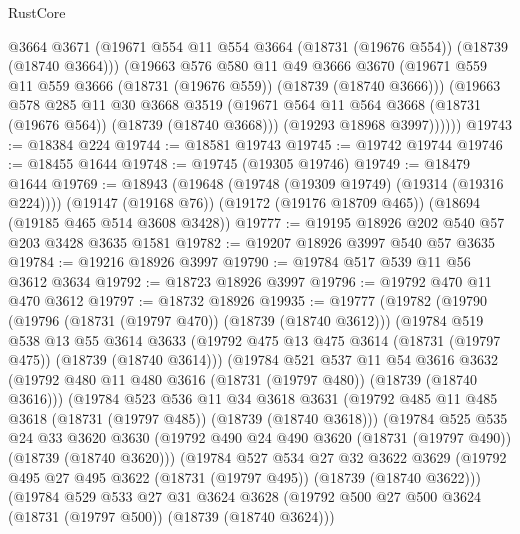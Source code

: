 \begin{lexlean}{RustCore}
\begin{coremodule}
          @3664
          @3671
          (@19671 @554 @11 @554 @3664 (@18731 (@19676 @554)) (@18739 (@18740 @3664)))
          (@19663
            @576
            @580
            @11
            @49
            @3666
            @3670
            (@19671 @559 @11 @559 @3666 (@18731 (@19676 @559)) (@18739 (@18740 @3666)))
            (@19663
              @578
              @285
              @11
              @30
              @3668
              @3519
              (@19671 @564 @11 @564 @3668 (@18731 (@19676 @564)) (@18739 (@18740 @3668)))
              (@19293 @18968 @3997))))))
@19743 := @18384 @224
@19744 := @18581 @19743
@19745 := @19742 @19744
@19746 := @18455 @1644
@19748 := @19745 (@19305 @19746)
@19749 := @18479 @1644
@19769 := @18943
    (@19648 (@19748 (@19309 @19749) (@19314 (@19316 @224))))
    (@19147 (@19168 @76))
    (@19172 (@19176 @18709 @465))
    (@18694 (@19185 @465 @514 @3608 @3428))
@19777 := @19195 @18926 @202 @540 @57 @203 @3428 @3635 @1581
@19782 := @19207 @18926 @3997 @540 @57 @3635
@19784 := @19216 @18926 @3997
@19790 := @19784 @517 @539 @11 @56 @3612 @3634
@19792 := @18723 @18926 @3997
@19796 := @19792 @470 @11 @470 @3612
@19797 := @18732 @18926
@19935 := @19777
    (@19782
      (@19790
        (@19796 (@18731 (@19797 @470)) (@18739 (@18740 @3612)))
        (@19784
          @519
          @538
          @13
          @55
          @3614
          @3633
          (@19792 @475 @13 @475 @3614 (@18731 (@19797 @475)) (@18739 (@18740 @3614)))
          (@19784
            @521
            @537
            @11
            @54
            @3616
            @3632
            (@19792 @480 @11 @480 @3616 (@18731 (@19797 @480)) (@18739 (@18740 @3616)))
            (@19784
              @523
              @536
              @11
              @34
              @3618
              @3631
              (@19792 @485 @11 @485 @3618 (@18731 (@19797 @485)) (@18739 (@18740 @3618)))
              (@19784
                @525
                @535
                @24
                @33
                @3620
                @3630
                (@19792 @490 @24 @490 @3620 (@18731 (@19797 @490)) (@18739 (@18740 @3620)))
                (@19784
                  @527
                  @534
                  @27
                  @32
                  @3622
                  @3629
                  (@19792 @495 @27 @495 @3622 (@18731 (@19797 @495)) (@18739 (@18740 @3622)))
                  (@19784
                    @529
                    @533
                    @27
                    @31
                    @3624
                    @3628
                    (@19792 @500 @27 @500 @3624 (@18731 (@19797 @500)) (@18739 (@18740 @3624)))

\end{coremodule}
\end{lexlean}
